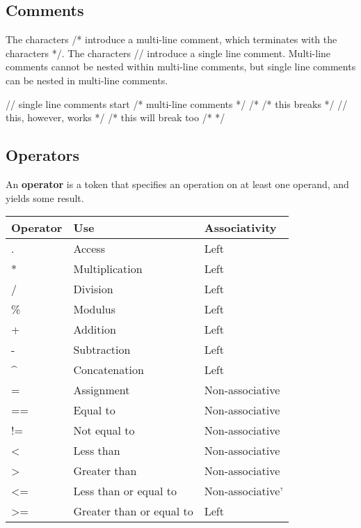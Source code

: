\documentclass[oneside]{book}
\begin{document}
\subsection{Comments}
The characters /* introduce a multi-line comment, which terminates with the characters */. The characters // introduce a single line comment. Multi-line comments cannot be nested within multi-line comments, but single line comments can be nested in multi-line comments.\\
\begin{mdframed}
[hidealllines=true,backgroundcolor=gray!10,skipbelow=.5em,skipabove=.5em]
\begin{code}
// single line comments start 
/*
	multi-line comments
*/
/*
	/* this breaks */
	// this, however, works
*/
/* this will break too /* */
\end{code}
\end{mdframed}

\subsection{Operators}
An \textbf{operator} is a token that specifies an operation on at least one operand, and yields some result.
\begin{center}
  \begin{tabular}{| l | l| l|}
    \hline
    \textbf{Operator} & \textbf{Use} & \textbf{Associativity}\\ \hline
    . & Access & Left \\ \hline
    * & Multiplication & Left \\ \hline
    / & Division & Left \\ \hline
    \% & Modulus & Left \\ \hline
    + & Addition & Left \\ \hline
    - & Subtraction & Left \\ \hline
    \textasciicircum  & Concatenation & Left \\ \hline
    = & Assignment  & Non-associative\\ \hline
    == & Equal to  & Non-associative\\ \hline
    != & Not equal to  & Non-associative \\ \hline
    \textless & Less than  & Non-associative \\ \hline
    \textgreater & Greater than  & Non-associative \\ \hline
    \textless= & Less than or equal to  & Non-associative' \\ \hline
    \textgreater= & Greater than or equal to  & Left \\ \hline
  \end{tabular}
  
  
\end{center}
\end{document}
